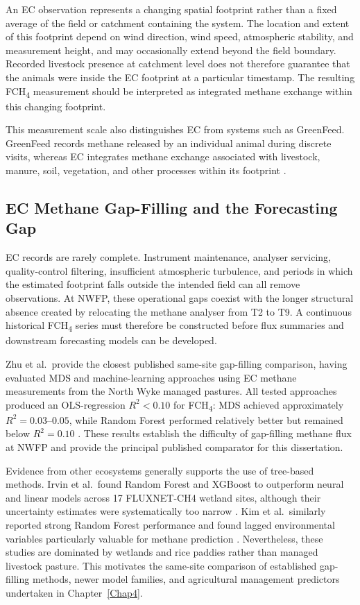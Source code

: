 An EC observation represents a changing spatial footprint rather than a fixed
average of the field or catchment containing the system. The location and extent
of this footprint depend on wind direction, wind speed, atmospheric stability,
and measurement height, and may occasionally extend beyond the field boundary.
Recorded livestock presence at catchment level does not therefore guarantee that
the animals were inside the EC footprint at a particular timestamp. The
resulting FCH\textsubscript{4} measurement should be interpreted as integrated
methane exchange within this changing footprint.

This measurement scale also distinguishes EC from systems such as GreenFeed.
GreenFeed records methane released by an individual animal during discrete
visits, whereas EC integrates methane exchange associated with livestock,
manure, soil, vegetation, and other processes within its footprint
\cite{olde2023ec,demeofilho2023greenfeed}.

\subsection{EC Methane Gap-Filling and the Forecasting Gap}

EC records are rarely complete. Instrument maintenance, analyser servicing,
quality-control filtering, insufficient atmospheric turbulence, and periods in
which the estimated footprint falls outside the intended field can all remove
observations. At NWFP, these operational gaps coexist with the longer structural
absence created by relocating the methane analyser from T2 to T9. A continuous
historical FCH\textsubscript{4} series must therefore be constructed before flux
summaries and downstream forecasting models can be developed.

Zhu et al.\ provide the closest published same-site gap-filling comparison,
having evaluated MDS and machine-learning approaches using EC methane
measurements from the North Wyke managed pastures. All tested approaches
produced an OLS-regression \(R^2<0.10\) for FCH\textsubscript{4}: MDS achieved
approximately \(R^2=0.03\)--\(0.05\), while Random Forest performed relatively
better but remained below \(R^2=0.10\) \cite{zhu2023a}. These results establish
the difficulty of gap-filling methane flux at NWFP and provide the principal
published comparator for this dissertation. 

Evidence from other ecosystems generally supports the use of tree-based
methods. Irvin et al.\ found Random Forest and XGBoost to outperform neural and
linear models across 17 FLUXNET-CH4 wetland sites, although their uncertainty
estimates were systematically too narrow \cite{irvin2021}. Kim et al.\ similarly
reported strong Random Forest performance and found lagged environmental
variables particularly valuable for methane prediction \cite{kim2020}.
Nevertheless, these studies are dominated by wetlands and rice paddies rather
than managed livestock pasture. This motivates the same-site comparison of
established gap-filling methods, newer model families, and agricultural
management predictors undertaken in Chapter~\ref{Chap4}.

